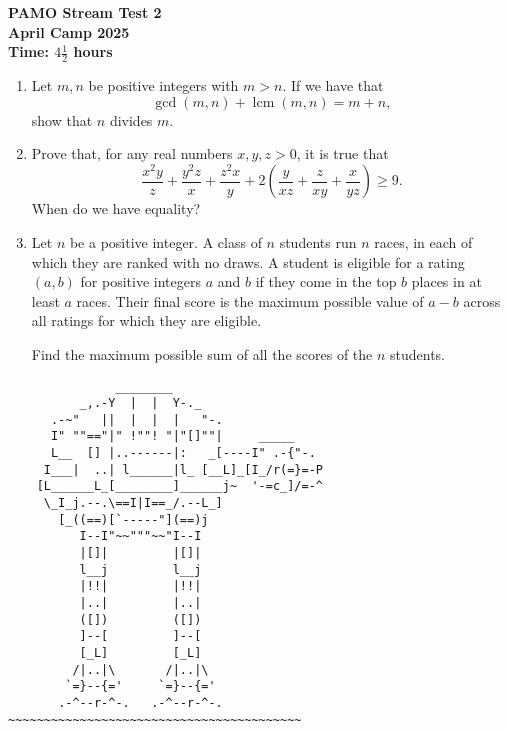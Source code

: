\documentclass[12pt]{article}
\begin{document}
\thispagestyle{empty}

\begin{center}
  \textbf{\Large PAMO Stream Test 2}
  \\ \vspace{1em}
  \textbf{\large April Camp 2025}
  \\ \vspace{1em}
  \textbf{\large Time: $4\frac{1}{2}$ hours}
\end{center}

\begin{enumerate}[leftmargin=0pt,topsep=2\bigskipamount,itemsep=\medskipamount]
\item Let $m, n$ be positive integers with $m>n$. If we have that
\[
\gcd(m,n) + \operatorname{lcm}(m, n) = m+n,
\]
show that $n$ divides $m$.

\item Prove that, for any real numbers $x, y, z>0$, it is true that
\[
\frac{x^2y}{z}+\frac{y^2z}{x}+\frac{z^2x}{y}+2\left(\frac{y}{xz}+\frac{z}{xy}+\frac{x}{yz}\right)\geqslant 9.
\]
When do we have equality?

\item Let $n$ be a positive integer. A class of $n$ students run $n$ races, in each of which they are ranked with no draws. A student is eligible for a rating $(a, b)$ for positive integers $a$ and $b$ if they come in the top $b$ places in at least $a$ races. Their final score is the maximum possible value of $a-b$ across all ratings for which they are eligible.\

\vspace{0.2cm}
Find the maximum possible sum of all the scores of the $n$ students.

\end{enumerate}


\vfill
\centering
\tiny %
\begin{BVerbatim}
               ________
          _,.-Y  |  |  Y-._
      .-~"   ||  |  |  |   "-.
      I" ""=="|" !""! "|"[]""|     _____
      L__  [] |..------|:   _[----I" .-{"-.
     I___|  ..| l______|l_ [__L]_[I_/r(=}=-P
    [L______L_[________]______j~  '-=c_]/=-^
     \_I_j.--.\==I|I==_/.--L_]
       [_((==)[`-----"](==)j
          I--I"~~"""~~"I--I
          |[]|         |[]|
          l__j         l__j
          |!!|         |!!|
          |..|         |..|
          ([])         ([])
          ]--[         ]--[
          [_L]         [_L]
         /|..|\       /|..|\
        `=}--{='     `=}--{='
       .-^--r-^-.   .-^--r-^-.
~~~~~~~~~~~~~~~~~~~~~~~~~~~~~~~~~~~~~~~~~
\end{BVerbatim}
\end{document}
